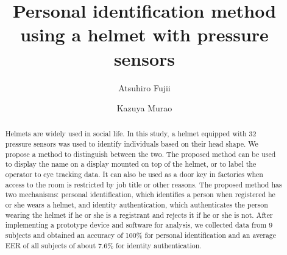 \documentclass[sigchi,authordraft]{acmart}
\begin{document}
\title{Personal identification method using a helmet with pressure sensors}

\author{Atsuhiro Fujii}

\author{Kazuya Murao}

\renewcommand{\shortauthors}{Trovato and Tobin, et al.}

\begin{abstract}
Helmets are widely used in social life. In this study, a helmet equipped with 32 pressure sensors was used to identify individuals based on their head shape. We propose a method to distinguish between the two. The proposed method can be used to display the name on a display mounted on top of the helmet, or to label the operator to eye tracking data. It can also be used as a door key in factories when access to the room is restricted by job title or other reasons. The proposed method has two mechanisms: personal identification, which identifies a person when registered he or she wears a helmet, and identity authentication, which authenticates the person wearing the helmet if he or she is a registrant and rejects it if he or she is not. After implementing a prototype device and software for analysis, we collected data from 9 subjects and obtained an accuracy of 100\% for personal identification and an average EER of all subjects of about 7.6\% for identity authentication.

\end{abstract}
\end{document}
